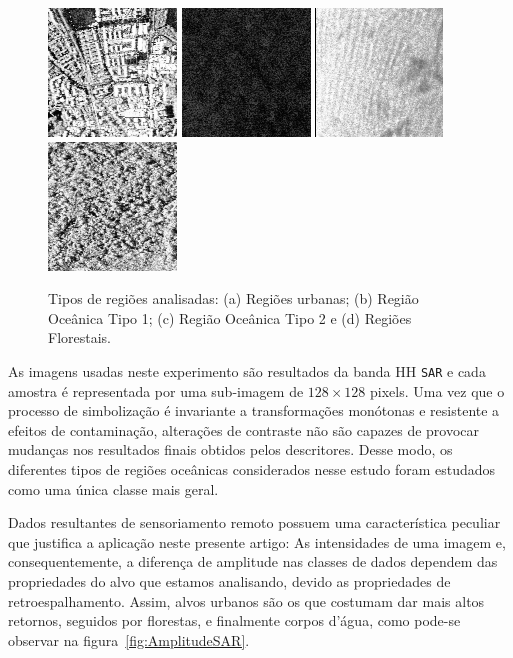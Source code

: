 \documentclass[12pt]{article}
\begin{document}
\begin{figure}[!h]
\centering
\includegraphics[width=.23\linewidth]{Figures/munichUrban.png}
\includegraphics[width=.23\linewidth]{Figures/Cape1.png}
\includegraphics[width=.23\linewidth]{Figures/Cape2.png}
\includegraphics[width=.23\linewidth]{Figures/guatemalaflorest.png}
\caption{Tipos de regiões analisadas: (a) Regiões urbanas; (b) Região Oceânica Tipo 1; (c) Região Oceânica Tipo 2 e (d) Regiões Florestais.}\label{fig:RegioesSAR}
\end{figure} 

As imagens usadas neste experimento são resultados da banda HH \texttt{SAR} e cada amostra é representada por uma sub-imagem de $128 \times 128$ pixels.
Uma vez que o processo de simbolização é invariante a 
transformações monótonas e resistente a efeitos de contaminação, alterações de contraste não são capazes de provocar mudanças nos resultados finais obtidos pelos descritores. 
Desse modo, os diferentes tipos de regiões oceânicas considerados nesse estudo foram estudados como uma única classe mais geral.

Dados resultantes de sensoriamento remoto possuem uma característica peculiar que justifica a aplicação neste presente artigo: 
As intensidades de uma imagem e, consequentemente, a diferença de amplitude nas classes de dados dependem das propriedades do alvo que estamos analisando, devido as propriedades de retroespalhamento. 
Assim, alvos urbanos são os que costumam dar mais altos retornos, seguidos por florestas, e finalmente corpos d’água, como pode-se observar na figura~\ref{fig:AmplitudeSAR}.
\end{document}
